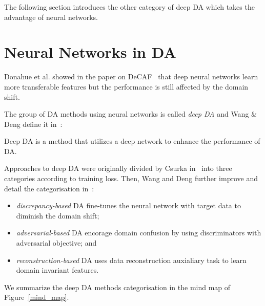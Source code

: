 The following section introduces the other category of deep DA
which takes the advantage of neural networks.

\section{Neural Networks in DA}

Donahue et al. showed in the paper on DeCAF~\cite{donahue2014}
that deep neural networks learn more transferable features
but the performance is still affected by the domain shift.


The group of DA methods using neural networks is called \textit{deep DA}
and Wang \& Deng define it in~\cite{wang2018}:

\begin{definition}
	Deep DA is a method that utilizes a deep network to enhance the performance of DA.
\end{definition}

Approaches to deep DA were originally divided by Csurka in~\cite{csurka2017}
into three categories according to training loss.
Then, Wang and Deng further improve and detail the categorisation in~\cite{wang2018}:

\begin{itemize}
	\item \textit{discrepancy-based} DA fine-tunes the neural network
		with target data to diminish the domain shift;
	\item \textit{adversarial-based} DA encorage domain confusion
		by using discriminators with adversarial objective; and
	\item \textit{reconstruction-based} DA uses data reconstruction auxialiary task to learn domain invariant features.
\end{itemize}

We summarize the deep DA methods categorisation in the mind map of Figure~\ref{mind_map}.

